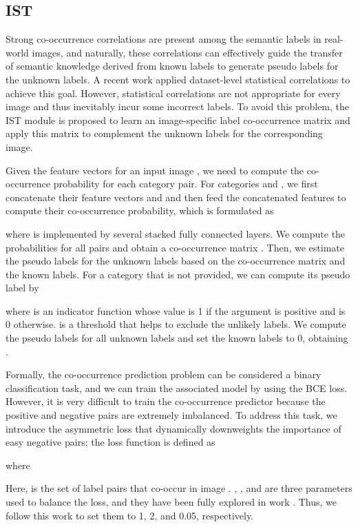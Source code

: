 \subsection{IST}
Strong co-occurrence correlations are present among the semantic labels in real-world images, and naturally, these correlations can effectively guide the transfer of semantic knowledge derived from known labels to generate pseudo labels for the unknown labels. A recent work \cite{huynh2020interactive} applied dataset-level statistical correlations to achieve this goal. However, statistical correlations are not appropriate for every image and thus inevitably incur some incorrect labels. To avoid this problem, the IST module is proposed to learn an image-specific label co-occurrence matrix and apply this matrix to complement the unknown labels for the corresponding image.

Given the feature vectors  for an input image , we need to compute the co-occurrence probability for each category pair. For categories  and , we first concatenate their feature vectors  and  and then feed the concatenated features to compute their co-occurrence probability, which is formulated as

where  is implemented by several stacked fully connected layers. We compute the probabilities for all pairs and obtain a co-occurrence matrix . Then, we estimate the pseudo labels for the unknown labels based on the co-occurrence matrix and the known labels. For a category  that is not provided, we can compute its pseudo label by

where  is an indicator function whose value is 1 if the argument is positive and is 0 otherwise.  is a threshold that helps to exclude the unlikely labels. We compute the pseudo labels for all unknown labels and set the known labels to 0, obtaining .

Formally, the co-occurrence prediction problem can be considered a binary classification task, and we can train the associated model by using the BCE loss. However, it is very difficult to train the co-occurrence predictor because the positive and negative pairs are extremely imbalanced. To address this task, we introduce the asymmetric loss \cite{ridnik2021asymmetric} that dynamically downweights the importance of easy negative pairs; the loss function is defined as

where

Here,  is the set of label pairs that co-occur in image . , , and  are three parameters used to balance the loss, and they have been fully explored in work \cite{ridnik2021asymmetric}. Thus, we follow this work to set them to 1, 2, and 0.05, respectively.


